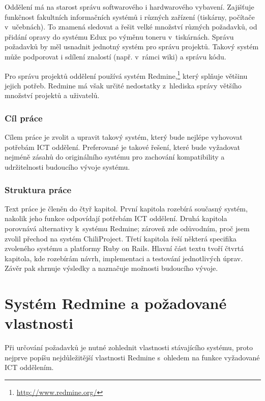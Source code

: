 \documentclass[thesis=B,czech]{FITthesis}[2012/05/02]
\begin{document}
\begin{introduction}

Oddělení   má na starost správu softwarového i hardwarového vybavení. Zajišťuje funkčnost fakultních informačních systémů i různých zařízení (tiskárny, počítače v~učebnách). To znamená sledovat a řešit velké množství různých požadavků, od přidání opravy do systému Edux po výměnu toneru v~tiskárnách. Správu požadavků by měl usnadnit jednotný systém pro správu projektů. Takový systém může podporovat i sdílení znalostí (např. v~rámci \gls{wiki}) a správu kódu.

Pro správu projektů oddělení používá systém Redmine,\footnote{\url{http://www.redmine.org/}} který splňuje většinu jejich potřeb. Redmine má však určité nedostatky z~hlediska správy většího množství projektů a uživatelů.

\subsection{Cíl práce}

Cílem práce je zvolit a upravit takový systém, který bude nejlépe vyhovovat potřebám ICT oddělení. Preferované je takové řešení, které bude vyžadovat nejméně zásahů do originálního systému pro zachování kompatibility a udržitelnosti budoucího vývoje systému.

\subsection{Struktura práce}

Text práce je členěn do čtyř kapitol. První kapitola rozebírá současný systém, nakolik jeho funkce odpovídají potřebám ICT oddělení. Druhá kapitola porovnává alternativy k~systému Redmine; zároveň zde odůvodním, proč jsem zvolil přechod na systém ChiliProject. Třetí kapitola řeší některá specifika zvoleného systému a platformy Ruby on Rails. Hlavní část textu tvoří čtvrtá kapitola, kde rozebírám návrh, implementaci a testování jednotlivých úprav. Závěr pak shrnuje výsledky a naznačuje možnosti budoucího vývoje.

\end{introduction}

\chapter{Systém Redmine a požadované vlastnosti}

Při určování požadavků je nutné zohlednit vlastnosti stávajícího
systému, proto nejprve popíšu nejdůležitější vlastnosti Redmine
s~ohledem na funkce vyžadované ICT oddělením.
\end{document}
